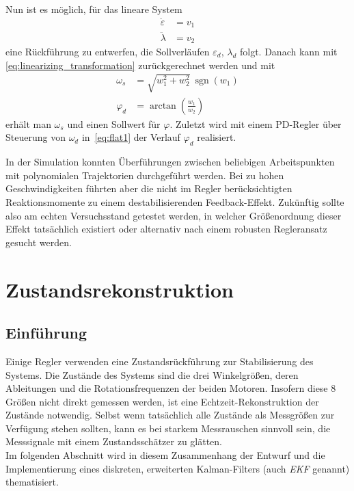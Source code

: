 \documentclass[times, 9pt,twocolumn]{article}
\DeclareMathOperator{\sgn}{\mathrm{sgn}}
\begin{document}
	Nun ist es möglich, für das lineare System
	\begin{subequations}
		\begin{align}
			\ddot{\varepsilon} &= v_1\\
			\ddot{\lambda} &= v_2
		\end{align}
	\end{subequations}
	eine Rückführung zu entwerfen, die Sollverläufen $\varepsilon_d$, $\lambda_d$ folgt.
	Danach kann mit \ref{eq:linearizing_transformation} zurückgerechnet werden und mit
	\begin{subequations}
		\begin{align}
\omega_s &= \sqrt{w_1^2 + w_2^2}\ \sgn (w_1)\\
\varphi_d &= \arctan \left(\frac{w_1}{w_2}\right) 
		\end{align}
	\end{subequations}
	erhält man \(\omega_s\) und einen Sollwert für \(\varphi\).
	Zuletzt wird mit einem PD-Regler über Steuerung von \(\omega_d\) in~\ref{eq:flat1} der Verlauf \(\varphi_d\) realisiert.

	In der Simulation konnten Überführungen zwischen beliebigen Arbeitspunkten mit polynomialen Trajektorien durchgeführt werden.
	Bei zu hohen Geschwindigkeiten führten aber die nicht im Regler berücksichtigten Reaktionsmomente zu einem destabilisierenden Feedback-Effekt.
	Zukünftig sollte also am echten Versuchsstand getestet werden, in welcher Größenordnung dieser Effekt tatsächlich existiert oder alternativ nach einem robusten Regleransatz gesucht werden.

	
	\section{Zustandsrekonstruktion}
	\subsection{Einf\"uhrung}
	Einige Regler verwenden eine Zustandsr\"uckf\"uhrung zur Stabilisierung des Systems. Die Zust\"ande des Systems sind die drei Winkelgr\"oßen, deren Ableitungen und die Rotationsfrequenzen der beiden Motoren. Insofern diese 8 Gr\"oßen nicht direkt gemessen werden, ist eine Echtzeit-Rekonstruktion der Zustände notwendig. 
	Selbst wenn tatsächlich alle Zustände als Messgrößen zur Verfügung stehen sollten, kann es bei starkem Messrauschen sinnvoll sein, die Messsignale mit einem Zustandsschätzer zu glätten. \\
	Im folgenden Abschnitt wird in diesem Zusammenhang der Entwurf und die Implementierung eines diskreten, erweiterten Kalman-Filters (auch \textit{EKF} genannt)  thematisiert. 
\end{document}
